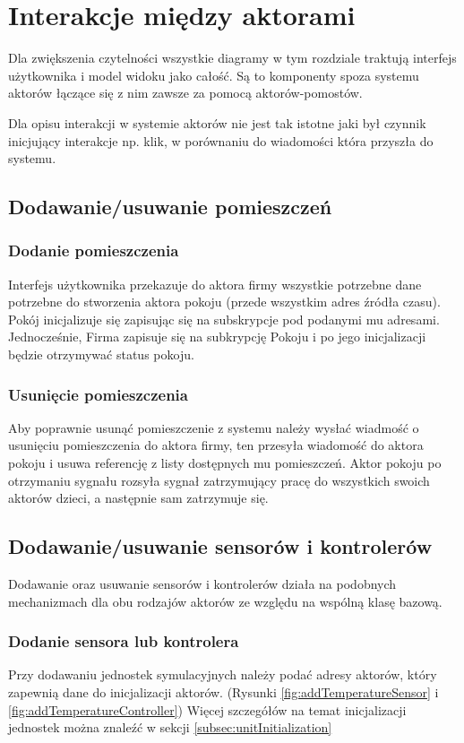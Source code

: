\chapter{Interakcje między aktorami}
Dla zwiększenia czytelności wszystkie diagramy w tym rozdziale traktują  interfejs użytkownika i model widoku jako całość. Są to komponenty spoza systemu aktorów łączące się z nim zawsze za pomocą aktorów-pomostów.

Dla opisu interakcji w systemie aktorów nie jest tak istotne jaki był czynnik inicjujący interakcje np. klik, w porównaniu do wiadomości która przyszła do systemu.

\section{Dodawanie/usuwanie pomieszczeń}
\subsection*{Dodanie pomieszczenia}
Interfejs użytkownika przekazuje do aktora firmy wszystkie potrzebne dane potrzebne do stworzenia aktora pokoju (przede wszystkim adres źródła czasu).
Pokój inicjalizuje się zapisując się na subskrypcje pod podanymi mu adresami.
Jednocześnie, Firma zapisuje się na subkrypcję Pokoju i po jego inicjalizacji będzie otrzymywać status pokoju.  


\subsection*{Usunięcie pomieszczenia}
Aby poprawnie usunąć pomieszczenie z systemu należy wysłać wiadmość o usunięciu pomieszczenia do aktora firmy, ten przesyła wiadomość do aktora pokoju i usuwa referencję z listy dostępnych mu pomieszczeń.
Aktor pokoju po otrzymaniu sygnału rozsyła sygnał zatrzymujący pracę do wszystkich swoich aktorów dzieci, a następnie sam zatrzymuje się. 


\section{Dodawanie/usuwanie sensorów i kontrolerów}
Dodawanie oraz usuwanie sensorów i kontrolerów działa na podobnych mechanizmach dla obu rodzajów aktorów ze względu na wspólną klasę bazową.

\subsection*{Dodanie sensora lub kontrolera}
Przy dodawaniu jednostek symulacyjnych należy podać adresy aktorów, który zapewnią dane do inicjalizacji aktorów. (Rysunki \ref{fig:addTemperatureSensor} i \ref{fig:addTemperatureController}) Więcej szczegółów na temat inicjalizacji jednostek można znaleźć w sekcji \ref{subsec:unitInitialization}

